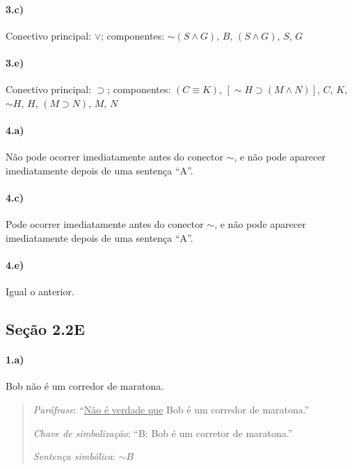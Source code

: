 \documentclass[pdftex,a4paper,12pt,brazil]{article} %
\begin{document}
\paragraph{3.c)} Conectivo principal: $\vee$; componentes: $\sim (S \wedge G)$, $B$,
$(S \wedge G)$, $S$, $G$

\paragraph{3.e)} Conectivo principal: $\supset$; componentes: $(C \equiv K)$, $[\sim H \supset (M \wedge N)]$,
$C$, $K$, $\sim H$, $H$, $(M \supset N)$, $M$, $N$

\paragraph{4.a)} Não pode ocorrer imediatamente antes do conector $\sim$, e não pode aparecer
imediatamente depois de uma sentença ``A''.

\paragraph{4.c)} Pode ocorrer imediatamente antes do conector $\sim$, e não pode aparecer
imediatamente depois de uma sentença ``A''.

\paragraph{4.e)} Igual o anterior.

\subsection{Seção 2.2E}
\label{tlb-2-22e}

\paragraph{1.a)} Bob não é um corredor de maratona.

\begin{quote}
  \emph{Paráfrase}: ``\underline{Não é verdade que} Bob é um corredor de maratona.''

  \emph{Chave de simbolização}: ``B: Bob é um corretor de maratona.''

  \emph{Sentença simbólica}: $\sim B$
\end{quote}
\end{document}
